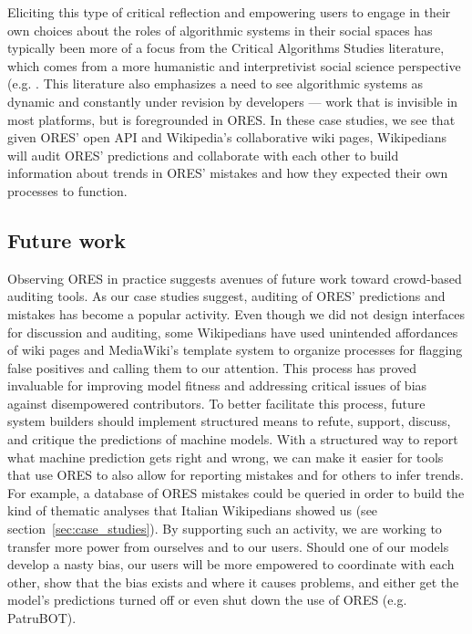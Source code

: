 Eliciting this type of critical reflection and empowering users to engage in their own choices about the roles of algorithmic systems in their social spaces has typically been more of a focus from the Critical Algorithms Studies literature, which comes from a more humanistic and interpretivist social science perspective (e.g. \cite{barocas2013governing, kitchin2017thinking}. This literature also emphasizes a need to see algorithmic systems as dynamic and constantly under revision by developers \cite{seaver2017algorithms} --- work that is invisible in most platforms, but is foregrounded in ORES. In these case studies, we see that given ORES' open API and Wikipedia's collaborative wiki pages, Wikipedians will audit ORES' predictions and collaborate with each other to build information about trends in ORES' mistakes and how they expected their own processes to function.

\subsection{Future work}
Observing ORES in practice suggests avenues of future work toward crowd-based auditing tools.  As our case studies suggest, auditing of ORES' predictions and mistakes has become a popular activity.  Even though we did not design interfaces for discussion and auditing, some Wikipedians have used unintended affordances of wiki pages and MediaWiki's template system to organize processes for flagging false positives and calling them to our attention.  This process has proved invaluable for improving model fitness and addressing critical issues of bias against disempowered contributors.  To better facilitate this process, future system builders should implement structured means to refute, support, discuss, and critique the predictions of machine models.  With a structured way to report what machine prediction gets right and wrong, we can make it easier for tools that use ORES to also allow for reporting mistakes and for others to infer trends.  For example, a database of ORES mistakes could be queried in order to build the kind of thematic analyses that Italian Wikipedians showed us (see section~\ref{sec:case_studies}).  By supporting such an activity, we are working to transfer more power from ourselves and to our users.  Should one of our models develop a nasty bias, our users will be more empowered to coordinate with each other, show that the bias exists and where it causes problems, and either get the model's predictions turned off or even shut down the use of ORES (e.g. PatruBOT).

